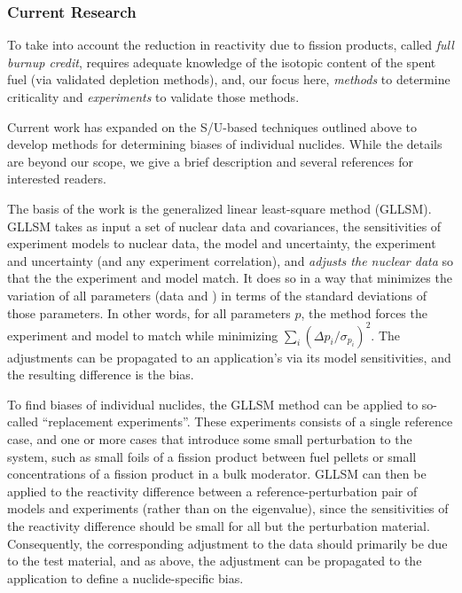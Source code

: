 \subsubsection*{Current Research}

To take into account the reduction in reactivity due to fission products,
called \textit{full burnup credit}, requires adequate knowledge of the 
isotopic content of the spent fuel (via validated depletion methods), and, 
our focus here, \textit{methods} to determine criticality and 
\textit{experiments} to validate those methods.

Current work has expanded on the S/U-based techniques
outlined above to develop methods for determining biases of 
individual nuclides. While the details are beyond our scope, we give 
a brief description and several references for interested readers.

The basis of the work is the generalized linear least-square method (GLLSM).
GLLSM takes as input a set of nuclear data and covariances, the sensitivities 
of experiment models to nuclear data, the model \keff and uncertainty,
the experiment \keff and uncertainty (and any experiment correlation), 
and \textit{adjusts the nuclear data}
so that the the experiment and model \keff match.  It does so in a way that
minimizes the variation of all parameters (data and \keff) in terms of the
standard deviations of those parameters.  In other words, for all parameters
$p$, the method forces the experiment and model \keff to match while 
minimizing $\sum_i (\Delta p_i / \sigma_{p_i})^2$.  The adjustments can be 
propagated to an application's \keff via its model sensitivities, and the 
resulting difference is the bias.

To find biases of individual nuclides, the GLLSM method can be applied to 
so-called ``replacement experiments''.  These experiments consists of a single
reference case, and one or more cases that introduce some small perturbation
to the system, such as small foils of a fission product between fuel pellets 
 or small concentrations of a fission product in a bulk
moderator.  GLLSM can then be applied to the reactivity 
difference between a reference-perturbation pair of models and experiments 
(rather than on the eigenvalue), since the sensitivities of the 
reactivity difference should be small for all but the perturbation 
material.  Consequently, the corresponding adjustment to the data should 
primarily be due to the test material, and as above, the adjustment can 
be propagated to the application to define a nuclide-specific bias.


